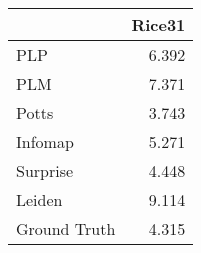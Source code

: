 \begin{tabular}{lr}
\toprule
{} & Rice31 \\
\midrule
PLP          &  6.392 \\
PLM          &  7.371 \\
Potts        &  3.743 \\
Infomap      &  5.271 \\
Surprise     &  4.448 \\
Leiden       &  9.114 \\
Ground Truth &  4.315 \\
\bottomrule
\end{tabular}
